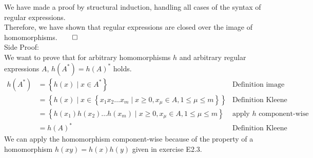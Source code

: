 We have made a proof by structural induction, handling all cases of the syntax of regular expressions.\\
Therefore, we have shown that regular expressions are closed over the image of homomorphisms.$\qed$ \\

\quad Side Proof:\\
We want to prove that for arbitrary homomorphisms $h$ and arbitrary regular expressions $A$, $h(A^{\ast}) = h(A)^{\ast}$ holds.\\
\begin{align*}
    h(A^{*}) &= \left\{h(x) \mid x \in A^{\ast} \right\} &\text{Definition image E2.3}\\
    &= \left\{h(x) \mid x \in \left\{ x_{1}x_{2}\ldots x_{m} \mid x\geq 0, x_{\mu} \in A, 1 \leq \mu \leq m \right\} \right\} &\text{Definition Kleene Closure}\\
    &= \left\{ h(x_{1})h(x_{2})\ldots h(x_{m}) \mid x\geq 0, x_{\mu} \in A, 1 \leq \mu \leq m \right\} &\text{apply }h\text{ component-wise}\\
    &= h(A)^{\ast} &\text{Definition Kleene Closure}
\end{align*}
We can apply the homomorphism component-wise because of the property of a homomorphism $h(xy)=h(x)h(y)$ given in exercise E2.3.\\


